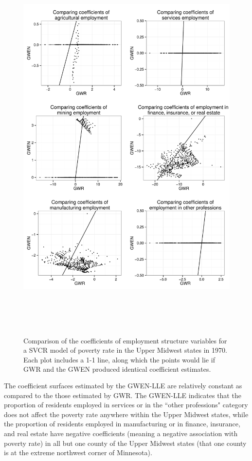 \documentclass[authoryear, review, 11pt]{elsarticle}
\begin{document}
	\begin{figure}
		\begin{center}
			\includegraphics[height=8in]{../../figures/poverty/1970-GWEN-GWR-comparison}
			\caption{Comparison of the coefficients of employment structure variables for a SVCR model of poverty rate in the Upper Midwest states in 1970. Each plot includes a 1-1 line, along which the points would lie if GWR and the GWEN produced identical coefficient estimates. \label{fig:gwen-gwr-comparison-1970}}
		\end{center}
	\end{figure}
			
	The coefficient surfaces estimated by the GWEN-LLE are relatively constant as compared to the those estimated by GWR. The GWEN-LLE indicates that the proportion of residents employed in services or in the ``other professions" category does not affect the poverty rate anywhere within the Upper Midwest states, while the proportion of residents employed in manufacturing or in finance, insurance, and real estate have negative coefficients (meaning a negative association with poverty rate) in all but one county of the Upper Midwest states (that one county is at the extreme northwest corner of Minnesota).
\end{document}
